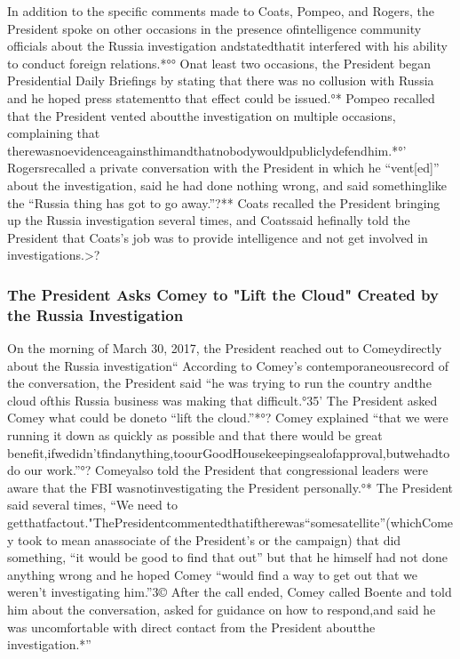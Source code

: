 In addition to the specific comments made to Coats, Pompeo, and Rogers, the President spoke on other occasions in the presence ofintelligence community officials about the Russia investigation andstatedthatit interfered with his ability to conduct foreign relations.*°° Onat least two occasions, the President began Presidential Daily Briefings by stating that there was no collusion with Russia and he hoped press statementto that effect could be issued.°* Pompeo recalled that the President vented aboutthe investigation on multiple occasions, complaining that therewasnoevidenceagainsthimandthatnobodywouldpubliclydefendhim.*°’ Rogersrecalled a private conversation with the President in which he “vent[ed]” about the investigation, said he had done nothing wrong, and said somethinglike the “Russia thing has got to go away.”?** Coats recalled the President bringing up the Russia investigation several times, and Coatssaid hefinally told the President that Coats’s job was to provide intelligence and not get involved in investigations.>?

\subsubsection{The President Asks Comey to "Lift the Cloud" Created by the Russia Investigation}

On the morning of March 30, 2017, the President reached out to Comeydirectly about the Russia investigation“ According to Comey’s contemporaneousrecord of the conversation, the President said “he was trying to run the country andthe cloud ofthis Russia business was making that difficult.°35' The President asked Comey what could be doneto “lift the cloud.”*°? Comey explained “that we were running it down as quickly as possible and that there would be great benefit,ifwedidn’tfindanything,toourGoodHousekeepingsealofapproval,butwehadtodo our work.”°? Comeyalso told the President that congressional leaders were aware that the FBI wasnotinvestigating the President personally.°* The President said several times, “We need to getthatfactout."ThePresidentcommentedthatiftherewas“somesatellite”(whichComey took to mean anassociate of the President’s or the campaign) that did something, “it would be good to find that out” but that he himself had not done anything wrong and he hoped Comey “would find a way to get out that we weren’t investigating him.”3© After the call ended, Comey called Boente and told him about the conversation, asked for guidance on how to respond,and said he was uncomfortable with direct contact from the President aboutthe investigation.*”

